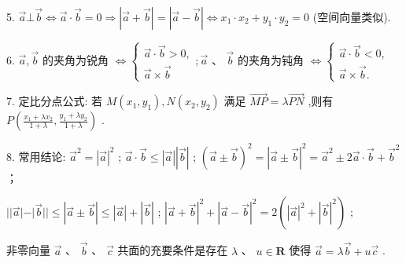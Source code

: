 5. $\overrightarrow{a} \bot  \overrightarrow{b} \Leftrightarrow  \overrightarrow{a} \cdot  \overrightarrow{b} = 0 \Rightarrow  \left| {\overrightarrow{a} + \overrightarrow{b}}\right|  = \left| {\overrightarrow{a} - \overrightarrow{b}}\right|  \Leftrightarrow  {x}_{1} \cdot  {x}_{2} + {y}_{1} \cdot  {y}_{2} = 0$ (空间向量类似).

6. $\overrightarrow{a},\overrightarrow{b}$ 的夹角为锐角 $\Leftrightarrow  \left\{  {\begin{array}{l} \overrightarrow{a} \cdot  \overrightarrow{b} > 0, \\  \overrightarrow{a} \times  \overrightarrow{b} \end{array};\overrightarrow{a}\text{ 、 }\overrightarrow{b}}\right.$ 的夹角为钝角 $\Leftrightarrow  \left\{  \begin{array}{l} \overrightarrow{a} \cdot  \overrightarrow{b} < 0, \\  \overrightarrow{a} \times  \overrightarrow{b}. \end{array}\right.$

7. 定比分点公式: 若 $M\left( {{x}_{1},{y}_{1}}\right) ,N\left( {{x}_{2},{y}_{2}}\right)$ 满足 $\overrightarrow{MP} = \lambda \overrightarrow{PN}$ ,则有 $P\left( {\frac{{x}_{1} + \lambda {x}_{2}}{1 + \lambda },\frac{{y}_{1} + \lambda {y}_{2}}{1 + \lambda }}\right)$ .

8. 常用结论:   ${\overset{ \rightarrow  }{a}}^{2} = {\left| \overset{ \rightarrow  }{a}\right| }^{2}$ ;    $\overset{ \rightarrow  }{a} \cdot  \overrightarrow{b} \leq  \left| \overset{ \rightarrow  }{a}\right| \left| \overset{ \rightarrow  }{b}\right|$ ;    ${\left( \overrightarrow{a} \pm  \overrightarrow{b}\right) }^{2} = {\left| \overrightarrow{a} \pm  \overrightarrow{b}\right| }^{2} = {\overrightarrow{a}}^{2} \pm  2\overrightarrow{a} \cdot  \overrightarrow{b} + {\overrightarrow{b}}^{2}$ ；

   $\left| \right| \overrightarrow{a}\left| -\right| \overrightarrow{b}\left| \right|  \leq  \left| {\overrightarrow{a} \pm  \overrightarrow{b}}\right|  \leq  \left| \overrightarrow{a}\right|  + \left| \overrightarrow{b}\right|$ ;    ${\left| \overrightarrow{a} + \overrightarrow{b}\right| }^{2} + {\left| \overrightarrow{a} - \overrightarrow{b}\right| }^{2} = 2\left( {{\left| \overrightarrow{a}\right| }^{2} + {\left| \overrightarrow{b}\right| }^{2}}\right)$ ;

  非零向量 $\overrightarrow{a}$ 、 $\overrightarrow{b}$ 、 $\overrightarrow{c}$ 共面的充要条件是存在 $\lambda$ 、 $u \in  \mathbf{R}$ 使得 $\overrightarrow{a} = \lambda \overrightarrow{b} + u\overrightarrow{c}$ .

